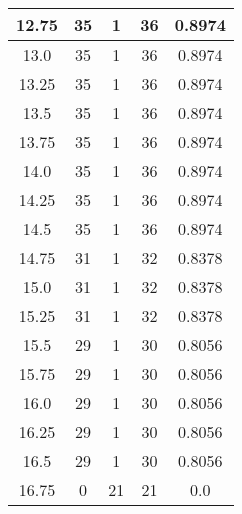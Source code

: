 \documentclass[letterpaper, 12pt]{article}
\begin{document}
\begin{longtable}{|c|c|c|c|c|}
\hline
12.75 & 35 & 1 & 36 & 0.8974 \\
\hline
13.0 & 35 & 1 & 36 & 0.8974 \\
\hline
13.25 & 35 & 1 & 36 & 0.8974 \\
\hline
13.5 & 35 & 1 & 36 & 0.8974 \\
\hline
13.75 & 35 & 1 & 36 & 0.8974 \\
\hline
14.0 & 35 & 1 & 36 & 0.8974 \\
\hline
14.25 & 35 & 1 & 36 & 0.8974 \\
\hline
14.5 & 35 & 1 & 36 & 0.8974 \\
\hline
14.75 & 31 & 1 & 32 & 0.8378 \\
\hline
15.0 & 31 & 1 & 32 & 0.8378 \\
\hline
15.25 & 31 & 1 & 32 & 0.8378 \\
\hline
15.5 & 29 & 1 & 30 & 0.8056 \\
\hline
15.75 & 29 & 1 & 30 & 0.8056 \\
\hline
16.0 & 29 & 1 & 30 & 0.8056 \\
\hline
16.25 & 29 & 1 & 30 & 0.8056 \\
\hline
16.5 & 29 & 1 & 30 & 0.8056 \\
\hline
16.75 & 0 & 21 & 21 & 0.0 \\
\hline
\end{longtable}
\end{document}
